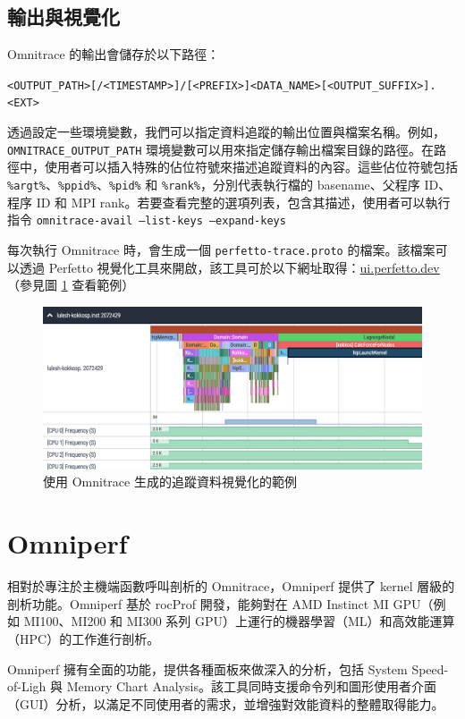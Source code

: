 \subsection{輸出與視覺化}
Omnitrace 的輸出會儲存於以下路徑：

\lstinline|<OUTPUT_PATH>[/<TIMESTAMP>]/[<PREFIX>]<DATA_NAME>[<OUTPUT_SUFFIX>].<EXT>|

透過設定一些環境變數，我們可以指定資料追蹤的輸出位置與檔案名稱。例如，\lstinline|OMNITRACE_OUTPUT_PATH| 環境變數可以用來指定儲存輸出檔案目錄的路徑。在路徑中，使用者可以插入特殊的佔位符號來描述追蹤資料的內容。這些佔位符號包括 \lstinline|%argt%|、\lstinline|%ppid%|、\lstinline|%pid%| 和 \lstinline|%rank%|，分別代表執行檔的 basename、父程序 ID、程序 ID 和 MPI rank。若要查看完整的選項列表，包含其描述，使用者可以執行指令 \lstinline|omnitrace-avail –list-keys –expand-keys|

每次執行 Omnitrace 時，會生成一個 \lstinline|perfetto-trace.proto| 的檔案。該檔案可以透過 Perfetto 視覺化工具來開啟，該工具可於以下網址取得：\url{ui.perfetto.dev}（參見圖 \ref{fig:omnitrace-visualization} 查看範例）

\begin{figure}
    \centering
    \includegraphics[width=1\linewidth]{Appendici/OmnitraceVisualization.png}
    \caption{使用 Omnitrace 生成的追蹤資料視覺化的範例}
    \label{fig:omnitrace-visualization}
\end{figure}


\section{Omniperf}

相對於專注於主機端函數呼叫剖析的 Omnitrace，Omniperf 提供了 kernel 層級的剖析功能。Omniperf 基於 rocProf 開發，能夠對在 AMD Instinct MI GPU（例如 MI100、MI200 和 MI300 系列 GPU）上運行的機器學習（ML）和高效能運算（HPC）的工作進行剖析。

Omniperf 擁有全面的功能，提供各種面板來做深入的分析，包括 System Speed-of-Ligh 與  Memory Chart Analysis。該工具同時支援命令列和圖形使用者介面（GUI）分析，以滿足不同使用者的需求，並增強對效能資料的整體取得能力。


